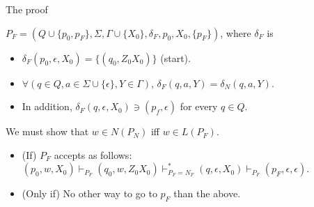 \documentclass[handout]{beamer}
\begin{document}
\begin{frame}{The proof}

    $P_F=(Q\cup \{p_0,p_F\},\Sigma,\Gamma\cup\{X_0\},\delta_F,p_0,X_0,\{p_F\})$, where $\delta_F$ is
    \begin{itemize}
        \item $\delta_F(p_0,\epsilon,X_0)=\{(q_0,Z_0X_0)\}$ (start).
        \item $\forall (q\in Q, a\in \Sigma\cup\{\epsilon\},Y\in \Gamma)$, $\delta_F(q,a,Y)=\delta_N(q,a,Y)$.
        \item In addition, $\delta_F(q,\epsilon,X_0)\ni (p_f,\epsilon)$ for every $q\in Q$.
    \end{itemize}
    We must show that $w\in N(P_N)$ iff $w\in L(P_F)$.
    \begin{itemize}
        \item (If) $P_F$ accepts as follows: $(p_0,w,X_0)\vdash_{P_F}(q_0,w,Z_0X_0)\vdash^*_{P_F=N_F}(q,\epsilon,X_0)\vdash_{P_F}(p_F,\epsilon,\epsilon) $.
        \item (Only if) No other way to go to $p_F$ than the above. \hfill\qedsymbol
    \end{itemize}
    

\end{frame}
\end{document}
